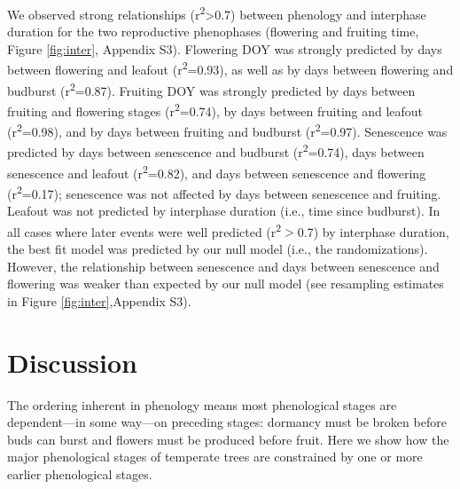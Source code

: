 \documentclass{article}
\begin{document}
\par We observed strong relationships (r\textsuperscript{2}>0.7) between phenology and interphase duration for the two reproductive phenophases (flowering and fruiting time, Figure \ref{fig:inter}, Appendix S3). Flowering DOY was strongly predicted by days between flowering and leafout (r\textsuperscript{2}=0.93), as well as by days between flowering and budburst (r\textsuperscript{2}=0.87). Fruiting DOY was strongly predicted by days between fruiting and flowering stages (r\textsuperscript{2}=0.74), by days between fruiting and leafout (r\textsuperscript{2}=0.98), and by days between fruiting and budburst (r\textsuperscript{2}=0.97). Senescence was predicted by days between senescence and budburst (r\textsuperscript{2}=0.74), days between senescence and leafout (r\textsuperscript{2}=0.82), and days between senescence and flowering (r\textsuperscript{2}=0.17); senescence was not affected by days between senescence and fruiting. Leafout was not predicted by interphase duration (i.e., time since budburst). In all cases where later events were well predicted (r\textsuperscript{2}$>$0.7) by interphase duration, the best fit model was predicted by our null model (i.e., the randomizations). However, the relationship between senescence and days between senescence and flowering was weaker than expected by our null model (see resampling estimates in Figure \ref{fig:inter},Appendix S3).

\section* {Discussion}
\par The ordering inherent in phenology means most phenological stages are dependent---in some way---on preceding stages: dormancy must be broken before buds can burst and flowers must be produced before fruit. Here we show how the major phenological stages of temperate trees are constrained by one or more earlier phenological stages. 
\end{document}
